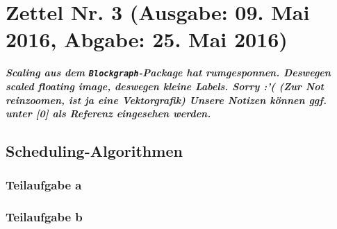 \documentclass{article}
\newcommand{\sect}[3]{	%
	\newpage
	\section*{Zettel Nr. #1 (Ausgabe: #2, Abgabe: #3)}
}
\newcommand{\sus}[1]{	%
	\subsection*{#1}
}
\newcommand{\sss}[1]{	%
	\subsubsection*{Teilaufgabe #1}
}
\begin{document}
\sect{3}{09. Mai 2016}{25. Mai 2016}
\textit{\textbf{Scaling aus dem \texttt{Blockgraph}-Package hat rumgesponnen. Deswegen scaled floating image, deswegen kleine Labels. Sorry :'( (Zur Not reinzoomen, ist ja eine Vektorgrafik) Unsere Notizen können ggf. unter [0] als Referenz eingesehen werden.}}
\sus{Scheduling-Algorithmen}
\sss{a}
\sss{b}
\end{document}
